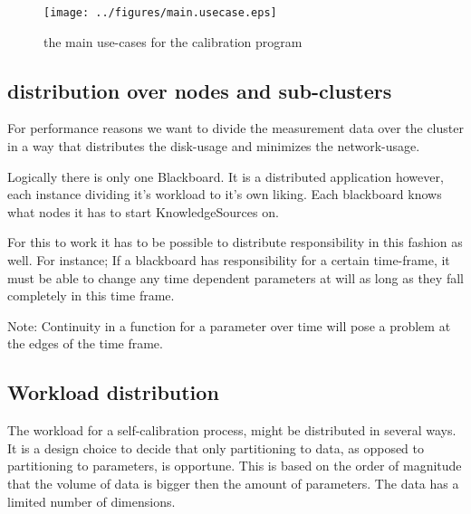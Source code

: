 \documentclass[]{lofar}
\begin{document}

      \begin{figure}
        \texttt{[image: ../figures/main.usecase.eps]}
        \hypertarget{fig:main.usecase}{}
        \caption{the main use-cases for the calibration program\label{fig:main.usecase}}
      \end{figure}

    \subsection{distribution over nodes and sub-clusters}
    \label{subsec:distribution}\hypertarget{subsec:distribution}{}%

      For performance reasons we want to divide the measurement data
      over the cluster in a way that distributes the disk-usage and
      minimizes the network-usage.

      Logically there is only one Blackboard. It is a distributed
      application however, each instance dividing it's workload to
      it's own liking. Each blackboard
      knows what nodes it has to start KnowledgeSources on.

      For this to work it has to be possible to distribute
      responsibility in this fashion as well. For instance; If a
      blackboard has responsibility for a certain time-frame, it must
      be able to change any time dependent parameters at will as long
      as they fall completely in this time frame.
      \begin{em}\large{Note: }Continuity in a function for a parameter over time will pose a problem at the edges of the time frame.\end{em}

    \subsection{Workload distribution}
    \label{subsec:workload-distribution}\hypertarget{subsec:workload-distribution}{}%

      The workload for a self-calibration process, might be
      distributed in several ways. It is a design choice to decide
      that only partitioning to data, as opposed to partitioning to
      parameters, is opportune. This is based on the order of
      magnitude that the volume of data is bigger then the amount of
      parameters. The data has a limited number of dimensions.
\end{document}
